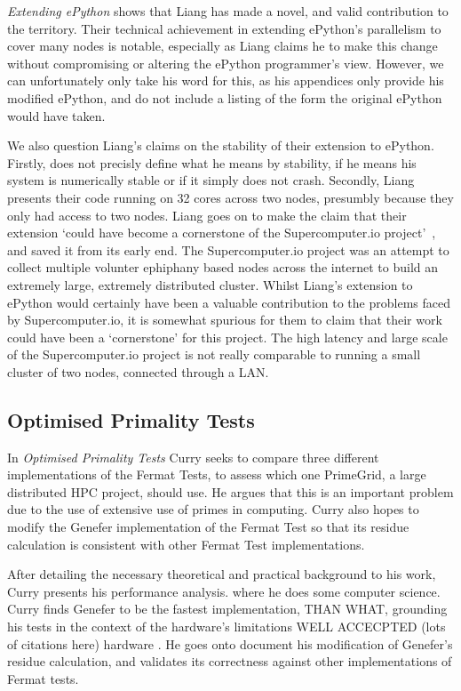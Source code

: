 \documentclass{article}[a4]
\begin{document}
 \textit{Extending ePython} shows that Liang has made a novel, and valid contribution to the territory. Their technical achievement in extending ePython's parallelism to cover many nodes is notable, especially as Liang claims he to make this change without compromising or altering the ePython programmer's view. However, we can unfortunately only take his word for this, as his appendices only provide his modified ePython, and do not include a listing of the form the original ePython would have taken.

 We also question Liang's claims on the stability of their extension to ePython. Firstly, does not precisly define what he means by stability, if he means his system is numerically stable or if it simply does not crash. Secondly, Liang presents their code running on 32 cores across two nodes, presumbly because they only had access to two nodes. Liang goes on to make the claim that their extension `could have become a cornerstone of the Supercomputer.io project'~\cite{Liang2017}, and saved it from its early end. The Supercomputer.io project was an attempt to collect multiple volunter ephiphany based nodes across the internet to build an extremely large, extremely distributed cluster. Whilst Liang's extension to ePython would certainly have been a valuable contribution to the problems faced by Supercomputer.io, it is somewhat spurious for them to claim that their work could have been a `cornerstone' for this project. The high latency and large scale of the Supercomputer.io project is not really comparable to running a small cluster of two nodes, connected through a LAN.

\subsection{Optimised Primality Tests}

In \textit{Optimised Primality Tests} Curry seeks to compare three different implementations of the Fermat Tests, to assess which one PrimeGrid, a large distributed HPC project, should use. He argues that this is an important problem due to the use of extensive use of primes in computing. Curry also hopes to modify the Genefer implementation of the Fermat Test so that its residue calculation is consistent with other Fermat Test implementations.

After detailing the necessary theoretical and practical background to his work, Curry presents his performance analysis.  where he does some computer science. Curry finds Genefer to be the fastest implementation, THAN WHAT,  grounding his tests in the context of the hardware's limitations WELL ACCECPTED (lots of citations here) hardware . He goes onto document his modification of Genefer's residue calculation, and validates its correctness against other implementations of Fermat tests.
\end{document}
